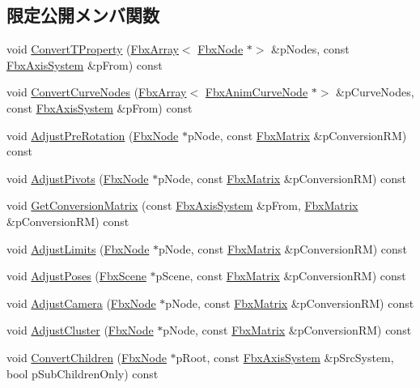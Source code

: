 \subsection*{限定公開メンバ関数}
\begin{DoxyCompactItemize}
\item 
void \hyperlink{class_fbx_axis_system_a41956e32f21b9709f40efef34a6d6121}{Convert\+T\+Property} (\hyperlink{class_fbx_array}{Fbx\+Array}$<$ \hyperlink{class_fbx_node}{Fbx\+Node} $\ast$$>$ \&p\+Nodes, const \hyperlink{class_fbx_axis_system}{Fbx\+Axis\+System} \&p\+From) const
\item 
void \hyperlink{class_fbx_axis_system_a39608f5f990b1ab304f13ee2b6df64ea}{Convert\+Curve\+Nodes} (\hyperlink{class_fbx_array}{Fbx\+Array}$<$ \hyperlink{class_fbx_anim_curve_node}{Fbx\+Anim\+Curve\+Node} $\ast$$>$ \&p\+Curve\+Nodes, const \hyperlink{class_fbx_axis_system}{Fbx\+Axis\+System} \&p\+From) const
\item 
void \hyperlink{class_fbx_axis_system_af7afdf5273c5ca9130ee8996f6f846a3}{Adjust\+Pre\+Rotation} (\hyperlink{class_fbx_node}{Fbx\+Node} $\ast$p\+Node, const \hyperlink{class_fbx_matrix}{Fbx\+Matrix} \&p\+Conversion\+RM) const
\item 
void \hyperlink{class_fbx_axis_system_aab7c9d541191268942f8dbbc3f531150}{Adjust\+Pivots} (\hyperlink{class_fbx_node}{Fbx\+Node} $\ast$p\+Node, const \hyperlink{class_fbx_matrix}{Fbx\+Matrix} \&p\+Conversion\+RM) const
\item 
void \hyperlink{class_fbx_axis_system_ae365f46f757b83df6426e5469938e8a0}{Get\+Conversion\+Matrix} (const \hyperlink{class_fbx_axis_system}{Fbx\+Axis\+System} \&p\+From, \hyperlink{class_fbx_matrix}{Fbx\+Matrix} \&p\+Conversion\+RM) const
\item 
void \hyperlink{class_fbx_axis_system_a699d144078ae640f30de2230a03c468f}{Adjust\+Limits} (\hyperlink{class_fbx_node}{Fbx\+Node} $\ast$p\+Node, const \hyperlink{class_fbx_matrix}{Fbx\+Matrix} \&p\+Conversion\+RM) const
\item 
void \hyperlink{class_fbx_axis_system_a4547ae0ec09f1c6e15e171e8cb56a7f9}{Adjust\+Poses} (\hyperlink{class_fbx_scene}{Fbx\+Scene} $\ast$p\+Scene, const \hyperlink{class_fbx_matrix}{Fbx\+Matrix} \&p\+Conversion\+RM) const
\item 
void \hyperlink{class_fbx_axis_system_ab51a2f8a7a77c1bfe77ba1da70d83cee}{Adjust\+Camera} (\hyperlink{class_fbx_node}{Fbx\+Node} $\ast$p\+Node, const \hyperlink{class_fbx_matrix}{Fbx\+Matrix} \&p\+Conversion\+RM) const
\item 
void \hyperlink{class_fbx_axis_system_a4b3ccc6e69b77974b3e5489cfefa2755}{Adjust\+Cluster} (\hyperlink{class_fbx_node}{Fbx\+Node} $\ast$p\+Node, const \hyperlink{class_fbx_matrix}{Fbx\+Matrix} \&p\+Conversion\+RM) const
\item 
void \hyperlink{class_fbx_axis_system_aca4f4de94c2d604fa55c001c25c0c227}{Convert\+Children} (\hyperlink{class_fbx_node}{Fbx\+Node} $\ast$p\+Root, const \hyperlink{class_fbx_axis_system}{Fbx\+Axis\+System} \&p\+Src\+System, bool p\+Sub\+Children\+Only) const
\end{DoxyCompactItemize}
